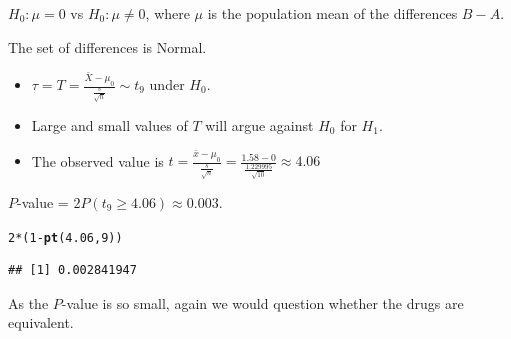 \documentclass[t,xcolor=pdftex,dvipsnames,table]{beamer}
\makeatletter
\newcommand{\hlnum}[1]{\textcolor[rgb]{0.686,0.059,0.569}{#1}}%
\newcommand{\hlopt}[1]{\textcolor[rgb]{0,0,0}{#1}}%
\newcommand{\hlstd}[1]{\textcolor[rgb]{0.345,0.345,0.345}{#1}}%
\newcommand{\hlkwd}[1]{\textcolor[rgb]{0.737,0.353,0.396}{\textbf{#1}}}%
\newenvironment{kframe}{%
 \def\at@end@of@kframe{}%
 \ifinner\ifhmode%
  \def\at@end@of@kframe{\end{minipage}}%
  \begin{minipage}{\columnwidth}%
 \fi\fi%
 \def\FrameCommand##1{\hskip\@totalleftmargin \hskip-\fboxsep
 \colorbox{shadecolor}{##1}\hskip-\fboxsep
     \hskip-\linewidth \hskip-\@totalleftmargin \hskip\columnwidth}%
 \MakeFramed {\advance\hsize-\width
   \@totalleftmargin\z@ \linewidth\hsize
   \@setminipage}}%
 {\par\unskip\endMakeFramed%
 \at@end@of@kframe}
\newenvironment{knitrout}{}{} %
\makeatother
\begin{document}
\begin{frame}[fragile]{}

$H_{0}: \mu = 0$ vs $H_{0}: \mu \neq 0$, where $\mu$ is the population mean of the differences $B-A$.

\vspace{.5cm}
 The set of differences is Normal.

\vspace{.5cm}
\begin{itemize}
\item $\tau = T = \frac{\bar{X} - \mu_{0}}{\frac{s}{\sqrt{n}}}  \sim t_{9}$ under $H_{0}$. 
\item Large and small values of $T$ will argue against $H_{0}$ for $H_{1}$. 
\item The observed value is $t=  \frac{\bar{x} - \mu_{0}}{\frac{s}{\sqrt{n}}} = \frac{1.58 - 0}{\frac{1.229995}{\sqrt{10}}} \approx 4.06$
\end{itemize}

\vspace{.5cm}
 $P$-value = $2 P( t_{9} \geq 4.06) \approx  0.003$.

\begin{knitrout}
\color{fgcolor}\begin{kframe}
\begin{alltt}
\hlnum{2}\hlopt{*}\hlstd{(}\hlnum{1}\hlopt{-}\hlkwd{pt}\hlstd{(}\hlnum{4.06}\hlstd{,}\hlnum{9}\hlstd{))}
\end{alltt}
\begin{verbatim}
## [1] 0.002841947
\end{verbatim}
\end{kframe}
\end{knitrout}

\vspace{.5cm}
 As the $P$-value is so small, again we would question whether the drugs are equivalent.
\end{frame}  
\end{document}
